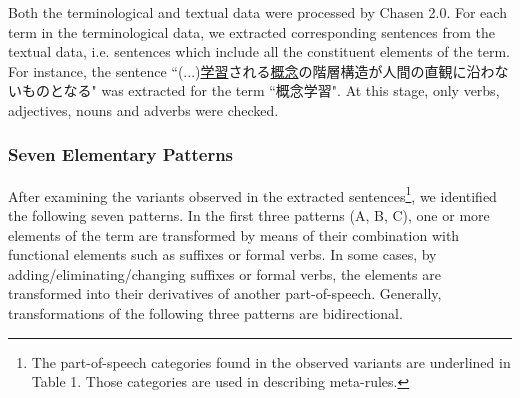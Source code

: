 Both the terminological and textual data were processed by Chasen 2.0. For each term in the terminological data, we extracted corresponding sentences from the textual data, i.e. sentences which include all the constituent elements of the term. For instance, the sentence ``(...)\underline{学習}される\underline{概念}の階層構造が人間の直観に沿わないものとなる" was extracted for the term ``概念学習". At this stage, only verbs, adjectives, nouns and adverbs were checked.

\subsubsection{Seven Elementary Patterns}

After examining the variants observed in the extracted sentences\footnote{The part-of-speech categories found in the observed variants are underlined in Table 1. Those categories are used in describing meta-rules.}, we identified the following seven patterns. In the first three patterns (A, B, C), one or more elements of the term are transformed by means of their combination with functional elements such as suffixes or formal verbs. In some cases, by adding/eliminating/changing suffixes or formal verbs, the elements are transformed into their derivatives of another part-of-speech. Generally, transformations of the following three patterns are bidirectional.

